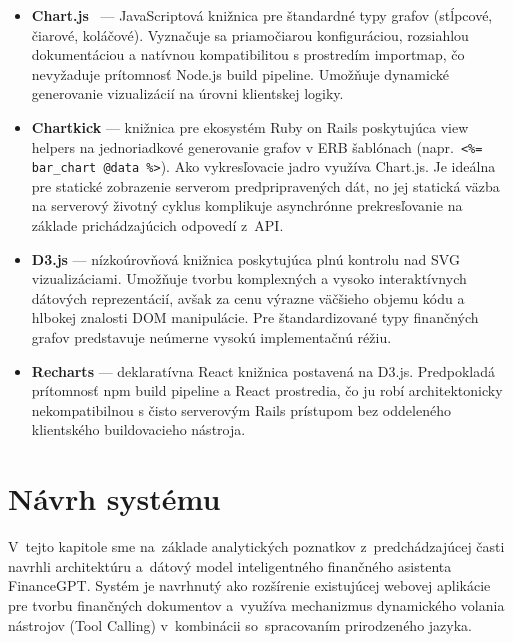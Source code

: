 \begin{itemize}
	\item \textbf{Chart.js}~\cite{chartjs2024} — JavaScriptová knižnica pre
		štandardné typy grafov (stĺpcové, %
		čiarové, koláčové). Vyznačuje sa priamočiarou konfiguráciou, rozsiahlou dokumentáciou
		a natívnou kompatibilitou s prostredím importmap, čo nevyžaduje prítomnosť
		Node.js build pipeline. Umožňuje dynamické generovanie vizualizácií na úrovni
		klientskej logiky.

	\item \textbf{Chartkick} — knižnica pre ekosystém Ruby on Rails poskytujúca
		view helpers na jednoriadkové generovanie grafov v ERB šablónach (napr.\ \texttt{<\%=
		bar\_chart @data \%>}). Ako vykresľovacie jadro využíva Chart.js. Je ideálna
		pre statické zobrazenie serverom predpripravených dát, no jej statická väzba na
		serverový životný cyklus komplikuje asynchrónne prekresľovanie na základe prichádzajúcich
		odpovedí z~API.

	\item \textbf{D3.js} — nízkoúrovňová knižnica poskytujúca plnú kontrolu nad
		SVG vizualizáciami. Umožňuje tvorbu komplexných a vysoko interaktívnych dátových
		reprezentácií, avšak za cenu výrazne väčšieho objemu kódu a hlbokej znalosti
		DOM manipulácie. Pre štandardizované typy finančných grafov predstavuje neúmerne
		vysokú implementačnú réžiu.

	\item \textbf{Recharts} — deklaratívna React knižnica postavená na D3.js. Predpokladá
		prítomnosť npm build pipeline a React prostredia, čo ju robí architektonicky
		nekompatibilnou s čisto serverovým Rails prístupom bez oddeleného
		klientského buildovacieho nástroja.
\end{itemize}

\vspace{1em}

\section{Návrh systému}
V~tejto kapitole sme na~základe analytických poznatkov z~predchádzajúcej časti navrhli
architektúru a~dátový model inteligentného finančného asistenta FinanceGPT.
Systém je navrhnutý ako rozšírenie existujúcej webovej aplikácie pre tvorbu
finančných dokumentov a~využíva mechanizmus dynamického volania nástrojov (Tool Calling)
v~kombinácii so~spracovaním prirodzeného jazyka.

